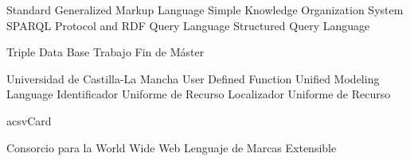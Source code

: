 {\begin{acronym}[XXXXXXXX]
      {Standard Generalized Markup Language}
      {Simple Knowledge Organization System}
    {\acs{SPARQL} Protocol and RDF Query Language}
       {Structured Query Language}

       {Triple Data Base}
       {Trabajo Fin de Máster}

      {Universidad de Castilla-La Mancha}
       {User Defined Function}
       {Unified Modeling Language}
       {Identificador Uniforme de Recurso}
       {Localizador Uniforme de Recurso}

     {acs{vCard}}

       {Consorcio para la World Wide Web}
       {Lenguaje de Marcas Extensible}

\end{acronym}
}




